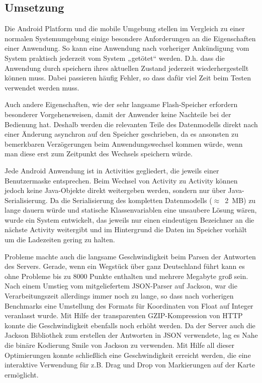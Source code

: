 \subsection*{Umsetzung}
Die Android Platform und die mobile Umgebung stellen im Vergleich zu einer normalen Systemumgebung einige besondere Anforderungen an die Eigenschaften 	einer Anwendung. So kann eine Anwendung nach vorheriger Ankündigung vom System praktisch jederzeit vom System „getötet“ werden. D.h. dass die Anwendung durch speichern ihres aktuellen Zustand jederzeit wiederhergestellt können muss. Dabei passieren häufig Fehler, so dass dafür viel Zeit beim Testen verwendet werden muss.

Auch andere Eigenschaften, wie der sehr langsame Flash-Speicher erfordern besonderer Vorgehensweisen, damit der Anwender keine Nachteile bei der Bedienung hat. Deshalb werden die relevanten Teile des Datenmodells direkt nach einer Änderung asynchron auf den Speicher geschrieben, da es ansonsten zu bemerkbaren Verzögerungen beim Anwendungswechsel kommen würde, wenn man diese erst zum Zeitpunkt des Wechsels speichern würde.

Jede Android Anwendung ist in Activities gegliedert, die jeweils einer Benutzermaske entsprechen. Beim Wechsel von Activity zu Activity können jedoch keine Java-Objekte direkt weitergeben werden, sondern nur über Java-Serialisierung. Da die Serialisierung des kompletten Datenmodells ($\approx$~2~MB) zu lange dauern würde und statische Klassenvariablen eine unsaubere Lösung wären, wurde ein System entwickelt, das jeweils nur einen eindeutigen Bezeichner an die nächste Activity weitergibt und im Hintergrund die Daten im Speicher vorhält um die Ladezeiten gering zu halten.

Probleme machte auch die langsame Geschwindigkeit beim Parsen der Antworten des Servers. Gerade, wenn ein Wegstück über ganz Deutschland führt kann es ohne Probleme bis zu 8000 Punkte enthalten und mehrere Megabyte groß sein. Nach einem Umstieg vom mitgeliefertem JSON-Parser auf Jackson, war die Verarbeitungszeit allerdings immer noch zu lange, so dass nach vorherigen Benchmarks eine Umstellung des Formats für Koordinaten von Float auf Integer veranlasst wurde. Mit Hilfe der transparenten GZIP-Kompression von HTTP konnte die Geschwindigkeit ebenfalls noch erhöht werden. Da der Server auch die Jackson Bibliothek zum erstellen der Antworten in JSON verwendete, lag es Nahe die binäre Kodierung Smile von Jackson zu verwenden. Mit Hilfe all dieser Optimierungen konnte schließlich eine Geschwindigkeit erreicht werden, die eine interaktive Verwendung für z.B. Drag und Drop von Markierungen auf der Karte ermöglicht.